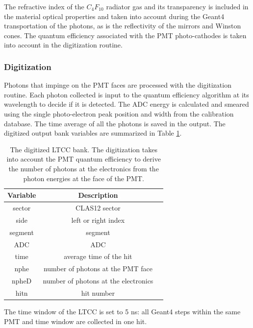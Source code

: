 The refractive index of the $C_4F_{10}$ radiator gas and its transparency is included in the material
optical properties and taken into account during the Geant4 transportation of the photons,
as is the reflectivity of the mirrors and Winston cones.
The quantum efficiency associated with the PMT photo-cathodes is taken into account in
the digitization routine.

\subsubsection{Digitization}

Photons that impinge on the PMT faces are processed with the digitization routine.
Each photon collected is input to the quantum efficiency algorithm at its wavelength to decide if it is detected.
The ADC energy is calculated and smeared using the single photo-electron peak position and width from the calibration database.
The time average of all the photons is saved in the output.
The digitized output bank variables are summarized in Table \ref{tab:ltccBank}.

\begin{table}[h]
	\begin{center}
		\begin{tabular}{| c | c | c |}
			\hline \hline
			Variable & Description                                         \\
			\hline
             sector  &                                     CLAS12 sector     \\
               side  &                               left or right index     \\
            segment  &                                           segment     \\
                ADC  &                                               ADC     \\
               time  &                           average time of the hit     \\
               nphe  &                  number of photons at the PMT face    \\
              npheD  &                 number of photons at the electronics  \\
               hitn  &                                        hit number     \\
			\hline \hline
		\end{tabular}
	\end{center}
	\caption{The digitized LTCC bank. The digitization takes into account the PMT quantum efficiency
             to derive the number of photons at the electronics from the photon energies
             at the face of the PMT.}\label{tab:ltccBank}
\end{table}

The time window  of the LTCC is set to 5 ns: all Geant4 steps within the same PMT and time window are collected in one hit.
